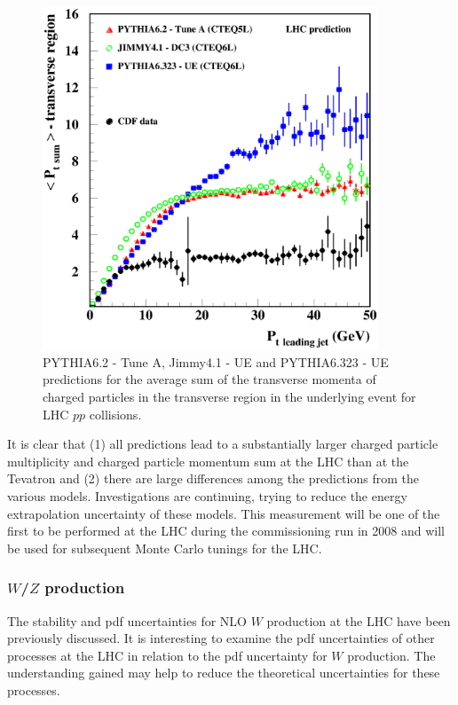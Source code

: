 \documentclass[12pt]{iopart}
\begin{document}
\begin{figure}[t]
\begin{center}
\includegraphics[width=10cm]{ptsum-trans.eps}
\end{center}
\caption{PYTHIA6.2 - Tune A, Jimmy4.1 - UE and PYTHIA6.323 - UE
predictions for the average sum of the transverse momenta of charged particles in the transverse
region in the underlying event for LHC $pp$ collisions.
\label{fig:ue_LHC_pt}
}
\end{figure}
%
It is clear that (1) all predictions lead to a substantially larger charged particle multiplicity and charged
particle momentum sum at the LHC than at the Tevatron and (2) there are large differences among the predictions
from the various models. Investigations are continuing, trying to reduce the energy  extrapolation uncertainty of
these models. This measurement will be one of the first to be performed at the LHC during the commissioning run
in 2008 and will be used for subsequent Monte Carlo tunings for the LHC.

\subsubsection{$W$/$Z$ production}
\label{sec:WZ}

The stability and pdf
uncertainties for NLO $W$ production at the LHC have been previously discussed. It is interesting to examine the
pdf uncertainties of other processes at the LHC in relation to the pdf uncertainty for $W$ production. The
understanding gained may help to reduce  the theoretical uncertainties for these processes. 
\end{document}
